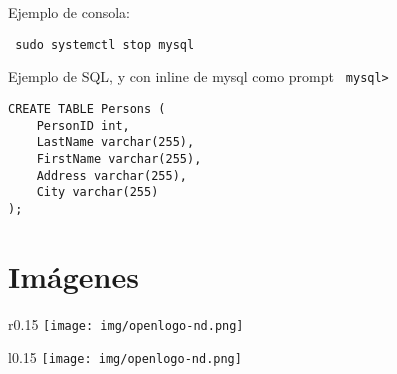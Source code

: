 \documentclass[12pt,a4paper,openany]{book}
\begin{document}
Ejemplo de consola: 	
\begin{verbatim}
 sudo systemctl stop mysql
\end{verbatim}

Ejemplo de SQL, y con inline de mysql como prompt \texttt{ mysql> }

\begin{tcolorbox}[arc=3mm,colback=solarizeddark,title=My heading line]
	\begin{verbatim}
CREATE TABLE Persons (
    PersonID int,
    LastName varchar(255),
    FirstName varchar(255),
    Address varchar(255),
    City varchar(255)
);
	\end{verbatim}
\end{tcolorbox}


%
%



\section{Imágenes}
\begin{wrapfigure}{r}{0.15\textwidth} %
    \centering %
    \vspace{-10pt} %
    \texttt{[image: img/openlogo-nd.png]}
\end{wrapfigure}\Blindtext[1]


\begin{wrapfigure}{l}{0.15\textwidth} %
    \centering
    \texttt{[image: img/openlogo-nd.png]}
\end{wrapfigure}\Blindtext[1]
\end{document}
